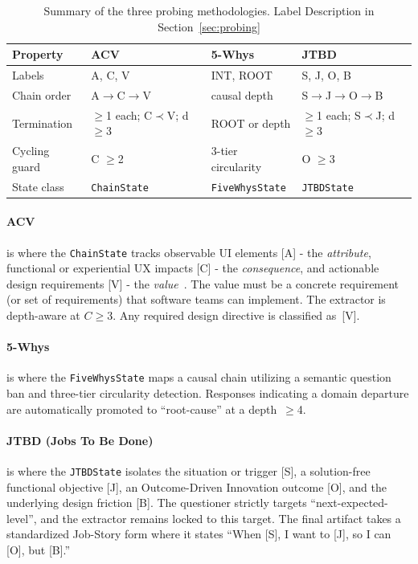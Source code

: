 \documentclass[sigconf,authordraft]{acmart}
\begin{document}
\begin{table}[t]
\caption{Summary of the three probing methodologies. Label Description in Section~\ref{sec:probing}}
\label{tab:methods}
\begin{tabular}{@{}p{1.5cm}p{1.5cm}p{1.8cm}p{1.7cm}@{}}
\toprule
Property               & ACV~\cite{gutman_means-end_1982}            & 5-Whys~\cite{ohno_toyota_2019}            & JTBD~\cite{ulwick_what_2005}              \\
\midrule
Labels      & A, C, V        & INT, ROOT         & S, J, O, B        \\
Chain order & A$\to$C$\to$V & causal depth   & S$\to$J$\to$O$\to$B \\
Termination & $\geq$1 each; C$\prec$V; d$\geq$3 & ROOT or depth & $\geq$1 each; S$\prec$J; d$\geq$3 \\
Cycling guard & C $\geq$2 & 3-tier circularity & O $\geq$3 \\
State class & \texttt{ChainState} & \texttt{FiveWhysState} & \texttt{JTBDState} \\
\bottomrule
\end{tabular}
\end{table}

\paragraph{ACV} is where the \texttt{ChainState} tracks observable UI elements [A] - the \textit{attribute}, functional or experiential UX impacts [C] - the \textit{consequence}, and actionable design requirements [V] - the \textit{value}~\cite{goodwin_designing_2011}. The value must be a concrete requirement (or set of requirements) that software teams can implement. The extractor is depth-aware at $C \geq 3$. Any required design directive is classified as~[V].

\paragraph{5-Whys} is where the \texttt{FiveWhysState} maps a causal chain utilizing a semantic question ban and three-tier circularity detection. Responses indicating a domain departure are automatically promoted to ``root-cause'' at a depth~$\geq$4.

\paragraph{JTBD (Jobs To Be Done)} is where the \texttt{JTBDState} isolates the situation or trigger [S], a solution-free functional objective [J], an Outcome-Driven Innovation outcome [O], and the underlying design friction [B]. The questioner strictly targets ``next-expected-level'', and the extractor remains locked to this target. The final artifact takes a standardized Job-Story form where it states ``When [S], I want to [J], so I can [O], but [B].'' 
\end{document}
